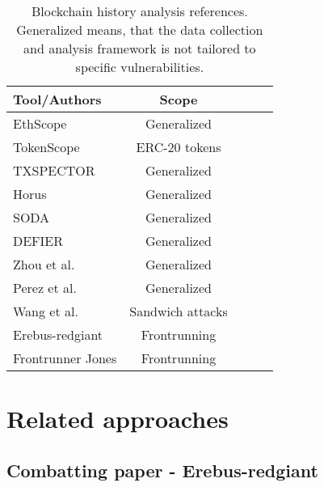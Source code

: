 \documentclass[draft,final]{vutinfth} %
\begin{document}
\begin{table}[h]
    \begin{center}
        \begin{tabular}{ | l | c  | c | c | c | }
            \hline
            Tool/Authors                                     & Scope            \\ \hline
            EthScope \cite{wu_time-travel_2022}              & Generalized      \\ \hline
            TokenScope \cite{chen_tokenscope_2019}           & ERC-20 tokens    \\ \hline
            TXSPECTOR \cite{zhang_txspector_2020}            & Generalized      \\ \hline
            Horus \cite{ferreira_torres_eye_2021}            & Generalized      \\ \hline
            SODA \cite{chen_soda_2020}                       & Generalized      \\ \hline
            DEFIER \cite{su_evil_2021}                       & Generalized      \\ \hline
            Zhou et al. \cite{zhou_ever-evolving_2020}       & Generalized      \\ \hline
            Perez et al. \cite{perez_smart_2021}             & Generalized      \\ \hline
            Wang et al. \cite{wang_impact_2022}              & Sandwich attacks \\ \hline
            Erebus-redgiant \cite{zhang_combatting_2023}     & Frontrunning     \\ \hline
            Frontrunner Jones \cite{torres_frontrunner_2021} & Frontrunning     \\ \hline
        \end{tabular}
        \caption{Blockchain history analysis references. Generalized means, that the data collection and analysis framework is not tailored to specific vulnerabilities.}
        \label{tab:blockchain_history_analyzers}
    \end{center}
\end{table}

\section{Related approaches}

\subsection{Combatting paper - Erebus-redgiant}
\end{document}
